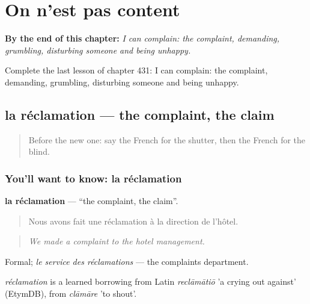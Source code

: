 
\chapter{On n'est pas content}
\label{ch:fr-on-n-est-pas-content}

\begin{chapteropening}
\textbf{By the end of this chapter:} \emph{I can complain: the complaint, demanding, grumbling, disturbing someone and being unhappy.}

Complete the last lesson of chapter 431: I can complain: the complaint, demanding, grumbling, disturbing someone and being unhappy.
\end{chapteropening}

\section[la réclamation]{la réclamation — the complaint, the claim}

\label{lesson:FR-C431-reclamation}



\begin{quote}
Before the new one: say the French for the shutter, then the French for the blind.
\end{quote}

\subsection*{You'll want to know: la réclamation}
\textbf{la réclamation} — \textquotedblleft{}the complaint, the claim\textquotedblright{}.

\begin{quote}
Nous avons fait une réclamation à la direction de l'hôtel.
\end{quote}

\begin{quote}
\emph{We made a complaint to the hotel management.}
\end{quote}

Formal; \emph{le service des réclamations} — the complaints department.

\begin{cousinweb}
\emph{réclamation} is a learned borrowing from Latin \emph{reclāmātiō} 'a crying out against' (EtymDB), from \emph{clāmāre} 'to shout'.
\end{cousinweb}


